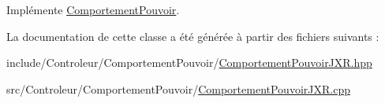Implémente \hyperlink{class_comportement_pouvoir_a8b8f4e753291ab73ab0016106f3948ff}{Comportement\-Pouvoir}.



La documentation de cette classe a été générée à partir des fichiers suivants \-:\begin{DoxyCompactItemize}
\item 
include/\-Controleur/\-Comportement\-Pouvoir/\hyperlink{_comportement_pouvoir_j_x_r_8hpp}{Comportement\-Pouvoir\-J\-X\-R.\-hpp}\item 
src/\-Controleur/\-Comportement\-Pouvoir/\hyperlink{_comportement_pouvoir_j_x_r_8cpp}{Comportement\-Pouvoir\-J\-X\-R.\-cpp}\end{DoxyCompactItemize}
